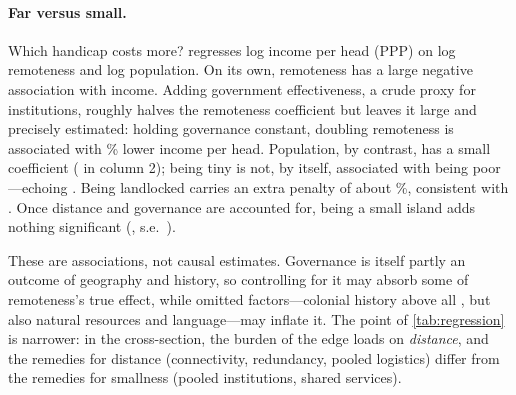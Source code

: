 \paragraph{Far versus small.} Which handicap costs more? 
regresses log income per head (PPP) on log remoteness and log population. On
its own, remoteness has a large negative association with income. Adding
government effectiveness, a crude proxy for institutions, roughly halves the
remoteness coefficient but leaves it large and precisely estimated: holding
governance constant, doubling remoteness is associated with
\regDoubleRemotePctAbs\% lower income per head. Population, by contrast, has a
small coefficient (\regPopTwo{} in column 2); being tiny is not, by itself,
associated with being poor---echoing \textcite{easterly2000}. Being landlocked
carries an extra penalty of about \regLLDCpct\%, consistent with
\textcite{limao2001}. Once distance and governance are accounted for, being a
small island adds nothing significant (\regSIDS, s.e.\ \regSIDSse).

\begin{table}[t]
\centering
\caption{ OLS of log$_{10}$
  GDP per capita (PPP, \windowStart--\windowEnd) on log$_{10}$ remoteness and
  log$_{10}$ population. Robust (HC1) standard errors in parentheses;
  $^{*}p<0.1$, $^{**}p<0.05$, $^{***}p<0.01$.}
\label{tab:regression}
\small\sffamily

\end{table}

These are associations, not causal estimates. Governance is itself partly an
outcome of geography and history, so controlling for it may absorb some of
remoteness's true effect, while omitted factors---colonial history above
all \parencite{acemoglu2001}, but also natural resources and language---may
inflate it. The point of \cref{tab:regression} is narrower: in the cross-section,
the burden of the edge loads on \emph{distance}, and the remedies for distance
(connectivity, redundancy, pooled logistics) differ from the remedies for
smallness (pooled institutions, shared services).

